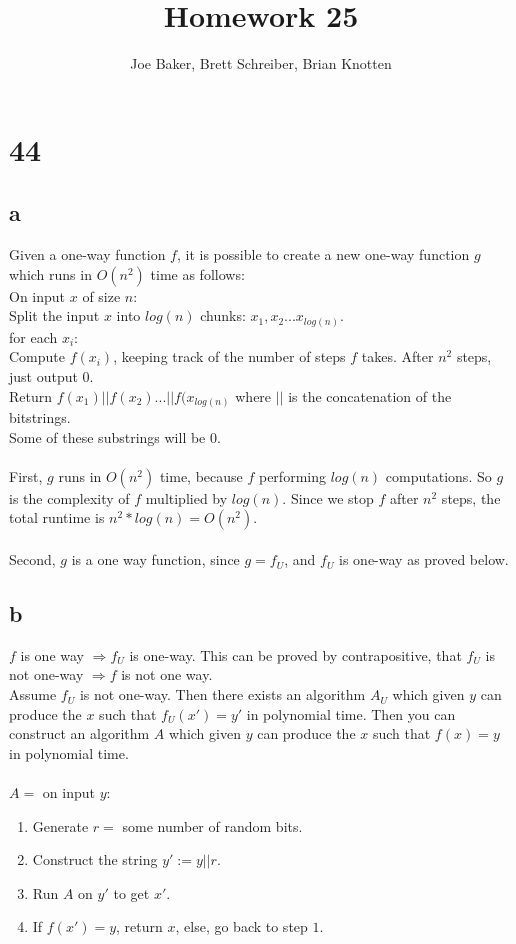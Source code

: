 \documentclass[letterpaper,notitlepage,twoside]{article}
\renewcommand{\implies}{\Rightarrow} %
\newcommand\tab[1][1cm]{\hspace*{#1}} %
\begin{document}
\title{Homework 25}
\author{Joe Baker, Brett Schreiber, Brian Knotten}
\maketitle
\section*{44}
\subsection*{a}
Given a one-way function $f$, it is possible to create a new one-way function $g$ which runs in $O(n^2)$ time as follows: \\
On input $x$ of size $n$: \\
\tab Split the input $x$ into $log(n)$ chunks: $x_1, x_2...x_{log(n)}$. \\
\tab for each $x_i$: \\
\tab \tab Compute $f(x_i)$, keeping track of the number of steps $f$ takes. After $n^2$ steps, just output $0$.\\
\tab Return $f(x_1) || f(x_2) ... || f(x_{log(n)}$ where $||$ is the concatenation of the bitstrings. \\
\tab Some of these substrings will be $0$.\\\\
First, $g$ runs in $O(n^2)$ time, because $f$ performing $log(n)$ computations. So $g$ is the complexity of $f$ multiplied by $log(n)$. Since we stop $f$ after $n^2$ steps, the total runtime is $n^2 * log(n) = O(n^2)$. \\\\
Second, $g$ is a one way function, since $g = f_U$, and $f_U$ is one-way as proved below.

\subsection*{b}
$f$ is one way $\implies f_U$ is one-way. This can be proved by contrapositive, that $f_U$ is not one-way $\implies f$ is not one way. \\
Assume $f_U$ is not one-way. Then there exists an algorithm $A_U$ which given $y$ can produce the $x$ such that $f_U(x') = y'$ in polynomial time. Then you can construct an algorithm $A$ which given $y$ can produce the $x$ such that $f(x) = y$ in polynomial time.
\\\\
$A =$ on input $y$:
\begin{enumerate}
\item Generate $r = $ some number of random bits.
\item Construct the string $y' := y || r$.
\item Run $A$ on $y'$ to get $x'$.
\item If $f(x') = y$, return $x$, else, go back to step $1$.
\end{enumerate}
\end{document}
